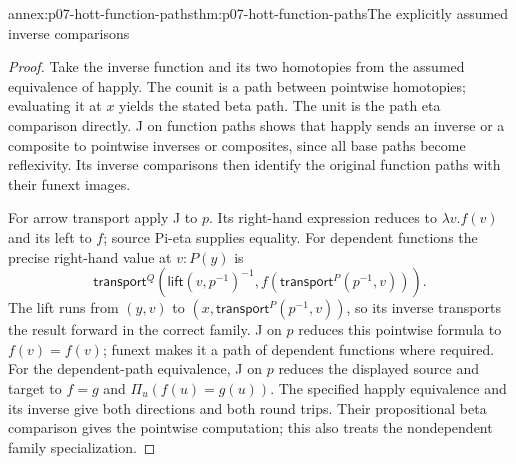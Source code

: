 \begin{annexitem}{annex:p07-hott-function-paths}{thm:p07-hott-function-paths}{The explicitly assumed inverse comparisons}
\begin{proof}
Take the inverse function and its two homotopies from the assumed
equivalence of happly. The counit is a path between pointwise homotopies;
evaluating it at $x$ yields the stated beta path. The unit is the
path eta comparison directly. J on function paths shows that happly
sends an inverse or a composite to pointwise inverses or composites,
since all base paths become reflexivity. Its inverse comparisons
then identify the original function paths with their funext images.

For arrow transport apply J to $p$. Its right-hand expression reduces
to $\lambda v.f(v)$ and its left to $f$; source Pi-eta supplies equality.
For dependent functions the precise right-hand value at $v:P(y)$ is
\[
 \mathsf{transport}^{Q}
 (\mathsf{lift}(v,p^{-1})^{-1},
                       f(\mathsf{transport}^{P}(p^{-1},v))).
\]
The lift runs from $(y,v)$ to $(x,\mathsf{transport}^{P}(p^{-1},v))$,
so its inverse transports the result forward in the correct family.
J on $p$ reduces this pointwise formula to $f(v)=f(v)$; funext makes
it a path of dependent functions where required. For the dependent-path
equivalence, J on $p$ reduces the displayed source and target to
$f=g$ and $\Pi_u(f(u)=g(u))$. The specified happly equivalence and
its inverse give both directions and both round trips. Their
propositional beta comparison gives the pointwise computation; this
also treats the nondependent family specialization.
\end{proof}
\end{annexitem}

